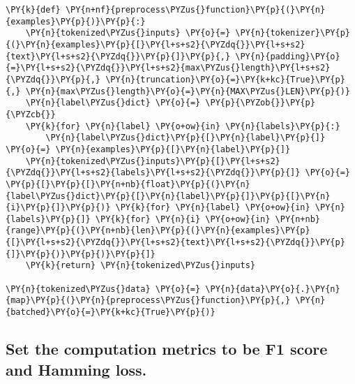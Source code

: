 \documentclass[../main.tex]{subfiles}
\begin{document}
    \begin{tcolorbox}[breakable, size=fbox, boxrule=1pt, pad at break*=1mm,colback=cellbackground, colframe=cellborder]
\begin{Verbatim}[commandchars=\\\{\}]
\PY{k}{def} \PY{n+nf}{preprocess\PYZus{}function}\PY{p}{(}\PY{n}{examples}\PY{p}{)}\PY{p}{:}
    \PY{n}{tokenized\PYZus{}inputs} \PY{o}{=} \PY{n}{tokenizer}\PY{p}{(}\PY{n}{examples}\PY{p}{[}\PY{l+s+s2}{\PYZdq{}}\PY{l+s+s2}{text}\PY{l+s+s2}{\PYZdq{}}\PY{p}{]}\PY{p}{,} \PY{n}{padding}\PY{o}{=}\PY{l+s+s2}{\PYZdq{}}\PY{l+s+s2}{max\PYZus{}length}\PY{l+s+s2}{\PYZdq{}}\PY{p}{,} \PY{n}{truncation}\PY{o}{=}\PY{k+kc}{True}\PY{p}{,} \PY{n}{max\PYZus{}length}\PY{o}{=}\PY{n}{MAX\PYZus{}LEN}\PY{p}{)}
    \PY{n}{label\PYZus{}dict} \PY{o}{=} \PY{p}{\PYZob{}}\PY{p}{\PYZcb{}}
    \PY{k}{for} \PY{n}{label} \PY{o+ow}{in} \PY{n}{labels}\PY{p}{:}
        \PY{n}{label\PYZus{}dict}\PY{p}{[}\PY{n}{label}\PY{p}{]} \PY{o}{=} \PY{n}{examples}\PY{p}{[}\PY{n}{label}\PY{p}{]}
    \PY{n}{tokenized\PYZus{}inputs}\PY{p}{[}\PY{l+s+s2}{\PYZdq{}}\PY{l+s+s2}{labels}\PY{l+s+s2}{\PYZdq{}}\PY{p}{]} \PY{o}{=} \PY{p}{[}\PY{p}{[}\PY{n+nb}{float}\PY{p}{(}\PY{n}{label\PYZus{}dict}\PY{p}{[}\PY{n}{label}\PY{p}{]}\PY{p}{[}\PY{n}{i}\PY{p}{]}\PY{p}{)} \PY{k}{for} \PY{n}{label} \PY{o+ow}{in} \PY{n}{labels}\PY{p}{]} \PY{k}{for} \PY{n}{i} \PY{o+ow}{in} \PY{n+nb}{range}\PY{p}{(}\PY{n+nb}{len}\PY{p}{(}\PY{n}{examples}\PY{p}{[}\PY{l+s+s2}{\PYZdq{}}\PY{l+s+s2}{text}\PY{l+s+s2}{\PYZdq{}}\PY{p}{]}\PY{p}{)}\PY{p}{)}\PY{p}{]}
    \PY{k}{return} \PY{n}{tokenized\PYZus{}inputs}

\PY{n}{tokenized\PYZus{}data} \PY{o}{=} \PY{n}{data}\PY{o}{.}\PY{n}{map}\PY{p}{(}\PY{n}{preprocess\PYZus{}function}\PY{p}{,} \PY{n}{batched}\PY{o}{=}\PY{k+kc}{True}\PY{p}{)}
\end{Verbatim}
\end{tcolorbox}

    \subsection{Set the computation metrics to be F1 score and Hamming
loss.}\label{set-the-computation-metrics-to-be-f1-score-and-hamming-loss.}
\end{document}
